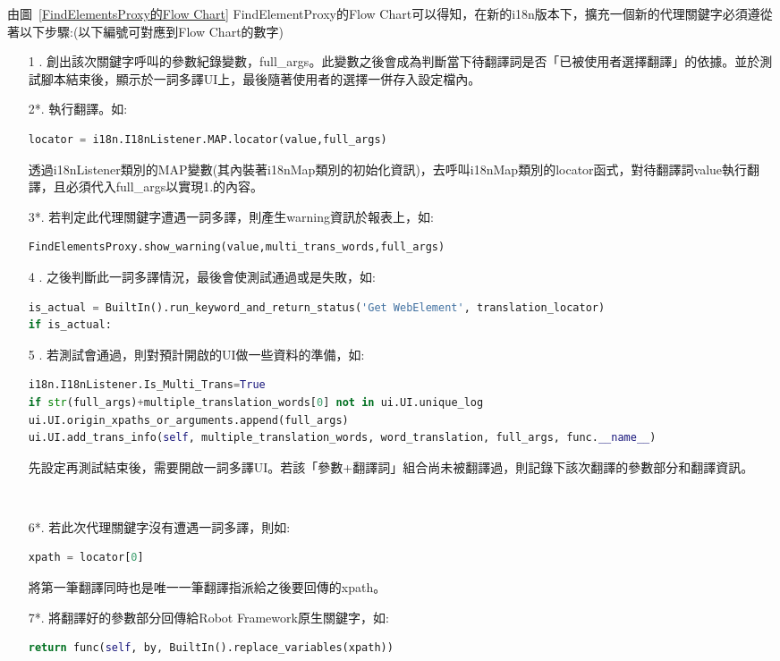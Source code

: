 由圖~\ref{FindElementsProxy的Flow Chart} FindElementProxy的Flow Chart可以得知，在新的i18n版本下，擴充一個新的代理關鍵字必須遵從著以下步驟:(以下編號可對應到Flow Chart的數字)
\begin{itemize}
\item[1 .]創出該次關鍵字呼叫的參數紀錄變數，full\_args。此變數之後會成為判斷當下待翻譯詞是否「已被使用者選擇翻譯」的依據。並於測試腳本結束後，顯示於一詞多譯UI上，最後隨著使用者的選擇一併存入設定檔內。

\item[2*.]執行翻譯。如:
\begin{lstlisting}[language={python}]
locator = i18n.I18nListener.MAP.locator(value,full_args)
\end{lstlisting}
透過i18nListener類別的MAP變數(其內裝著i18nMap類別的初始化資訊)，去呼叫i18nMap類別的locator函式，對待翻譯詞value執行翻譯，且必須代入full\_args以實現1.的內容。

\item[3*.]若判定此代理關鍵字遭遇一詞多譯，則產生warning資訊於報表上，如:
\begin{lstlisting}[language={python}]
FindElementsProxy.show_warning(value,multi_trans_words,full_args)
\end{lstlisting}

\item[4 .]之後判斷此一詞多譯情況，最後會使測試通過或是失敗，如:
\begin{lstlisting}[language={python}]
is_actual = BuiltIn().run_keyword_and_return_status('Get WebElement', translation_locator)
if is_actual:
\end{lstlisting}

\item[5 .]若測試會通過，則對預計開啟的UI做一些資料的準備，如:
\begin{lstlisting}[language={python}]
i18n.I18nListener.Is_Multi_Trans=True
if str(full_args)+multiple_translation_words[0] not in ui.UI.unique_log
ui.UI.origin_xpaths_or_arguments.append(full_args)
ui.UI.add_trans_info(self, multiple_translation_words, word_translation, full_args, func.__name__)
\end{lstlisting}
先設定再測試結束後，需要開啟一詞多譯UI。若該「參數+翻譯詞」組合尚未被翻譯過，則記錄下該次翻譯的參數部分和翻譯資訊。

\hspace*{\fill} \\
\item[6*.]若此次代理關鍵字沒有遭遇一詞多譯，則如:
\begin{lstlisting}[language={python}]
xpath = locator[0]
\end{lstlisting}
將第一筆翻譯同時也是唯一一筆翻譯指派給之後要回傳的xpath。

\item[7*.]將翻譯好的參數部分回傳給Robot Framework原生關鍵字，如:
\begin{lstlisting}[language={python}]
return func(self, by, BuiltIn().replace_variables(xpath))
\end{lstlisting}
\end{itemize}

